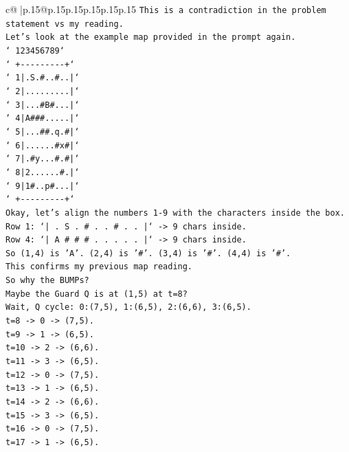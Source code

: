 \documentclass{article}
\begin{document}
{\begin{supertabular}{c@{$\;$}|p{.15\linewidth}@{}p{.15\linewidth}p{.15\linewidth}p{.15\linewidth}p{.15\linewidth}p{.15\linewidth}}
{{{\texttt{This is a contradiction in the problem statement vs my reading.} \\
\texttt{Let's look at the example map provided in the prompt again.} \\
\texttt{` 123456789`} \\
\texttt{`  +{-}{-}{-}{-}{-}{-}{-}{-}{-}+`} \\
\texttt{` 1|.S.\#..\#..|`} \\
\texttt{` 2|.........|`} \\
\texttt{` 3|...\#B\#...|`} \\
\texttt{` 4|A\#\#\#.....|`} \\
\texttt{` 5|...\#\#.q.\#|`} \\
\texttt{` 6|......\#x\#|`} \\
\texttt{` 7|.\#y...\#.\#|`} \\
\texttt{` 8|2......\#.|`} \\
\texttt{` 9|1\#..p\#...|`} \\
\texttt{`  +{-}{-}{-}{-}{-}{-}{-}{-}{-}+`} \\
\texttt{Okay, let's align the numbers 1{-}9 with the characters inside the box.} \\
\texttt{Row 1: `| . S . \# . . \# . . |` {-}> 9 chars inside.} \\
\texttt{Row 4: `| A \# \# \# . . . . . |` {-}> 9 chars inside.} \\
\texttt{So (1,4) is 'A'. (2,4) is '\#'. (3,4) is '\#'. (4,4) is '\#'.} \\
\texttt{This confirms my previous map reading.} \\
\texttt{So why the BUMPs?} \\
\texttt{Maybe the Guard Q is at (1,5) at t=8?} \\
\texttt{Wait, Q cycle: 0:(7,5), 1:(6,5), 2:(6,6), 3:(6,5).} \\
\texttt{t=8 {-}> 0 {-}> (7,5).} \\
\texttt{t=9 {-}> 1 {-}> (6,5).} \\
\texttt{t=10 {-}> 2 {-}> (6,6).} \\
\texttt{t=11 {-}> 3 {-}> (6,5).} \\
\texttt{t=12 {-}> 0 {-}> (7,5).} \\
\texttt{t=13 {-}> 1 {-}> (6,5).} \\
\texttt{t=14 {-}> 2 {-}> (6,6).} \\
\texttt{t=15 {-}> 3 {-}> (6,5).} \\
\texttt{t=16 {-}> 0 {-}> (7,5).} \\
\texttt{t=17 {-}> 1 {-}> (6,5).} \\
}}}
\end{supertabular}}
\end{document}
